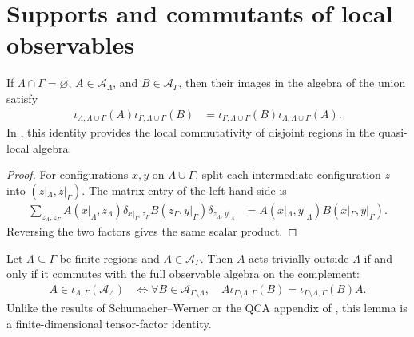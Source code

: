 \section{Supports and commutants of local observables}

\begin{lemma}
    \label{thm:qca_disjoint_local_inclusion_commute}
    \leanok
    If $\Lambda\cap\Gamma=\varnothing$, $A\in\mathcal A_\Lambda$, and
    $B\in\mathcal A_\Gamma$, then their images in the algebra of the union
    satisfy
    \begin{align}
        \iota_{\Lambda,\Lambda\cup\Gamma}(A)
        \iota_{\Gamma,\Lambda\cup\Gamma}(B)
         & =\iota_{\Gamma,\Lambda\cup\Gamma}(B)
        \iota_{\Lambda,\Lambda\cup\Gamma}(A).
    \end{align}
    In \cite[lines~2292--2300]{Cirac2017MPU}, this identity provides the local commutativity of disjoint regions in the
    quasi-local algebra.
\end{lemma}

\begin{proof}\leanok
    For configurations $x,y$ on $\Lambda\cup\Gamma$, split each intermediate
    configuration $z$ into $(z|_\Lambda,z|_\Gamma)$.  The matrix entry of the
    left-hand side is
    \begin{align}
        \sum_{z_\Lambda,z_\Gamma}
        A(x|_\Lambda,z_\Lambda)
        \delta_{x|_\Gamma,z_\Gamma}
        B(z_\Gamma,y|_\Gamma)
        \delta_{z_\Lambda,y|_\Lambda}
         & =A(x|_\Lambda,y|_\Lambda)
        B(x|_\Gamma,y|_\Gamma).
    \end{align}
    Reversing the two factors gives the same scalar product.
\end{proof}

\begin{lemma}
    \label{thm:qca_finite_relative_commutant}
    \leanok
    Let $\Lambda\subseteq\Gamma$ be finite regions and
    $A\in\mathcal A_\Gamma$. Then $A$ acts trivially outside $\Lambda$ if
    and only if it commutes with the full observable algebra on the complement:
    \begin{align}
        A\in\iota_{\Lambda,\Gamma}(\mathcal A_\Lambda)
         & \iff
        \forall B\in\mathcal A_{\Gamma\setminus\Lambda},\quad
        A\iota_{\Gamma\setminus\Lambda,\Gamma}(B)
        =\iota_{\Gamma\setminus\Lambda,\Gamma}(B)A.
    \end{align}
    Unlike the results of Schumacher--Werner or the QCA appendix of \cite{Cirac2017MPU}, this lemma is a finite-dimensional tensor-factor
    identity.
\end{lemma}

